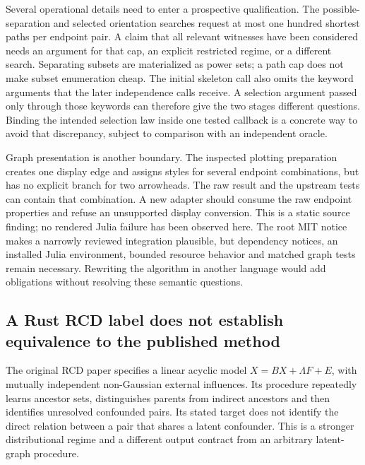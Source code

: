 Several operational details need to enter a prospective qualification.
The possible-separation and selected orientation searches request at
most one hundred shortest paths per endpoint pair. A claim that all
relevant witnesses have been considered needs an argument for that cap,
an explicit restricted regime, or a different search. Separating subsets
are materialized as power sets; a path cap does not make subset
enumeration cheap. The initial skeleton call also omits the keyword
arguments that the later independence calls receive. A selection
argument passed only through those keywords can therefore give the two
stages different questions. Binding the intended selection law inside
one tested callback is a concrete way to avoid that discrepancy, subject
to comparison with an independent oracle.
\citep{exec14_olatent_causalinference}

Graph presentation is another boundary. The inspected plotting
preparation creates one display edge and assigns styles for several
endpoint combinations, but has no explicit branch for two arrowheads.
The raw result and the upstream tests can contain that combination. A
new adapter should consume the raw endpoint properties and refuse an
unsupported display conversion. This is a static source finding; no
rendered Julia failure has been observed here. The root MIT notice makes
a narrowly reviewed integration plausible, but dependency notices, an
installed Julia environment, bounded resource behavior and matched graph
tests remain necessary. Rewriting the algorithm in another language
would add obligations without resolving these semantic questions.
\citep{exec14_olatent_causalinference}

\hypertarget{a-rust-rcd-label-does-not-establish-equivalence-to-the-published-method}{%
\subsection{A Rust RCD label does not establish equivalence to the
published
method}\label{a-rust-rcd-label-does-not-establish-equivalence-to-the-published-method}}

The original RCD paper specifies a linear acyclic model
\(X=BX+\Lambda F+E\), with mutually independent non-Gaussian external
influences. Its procedure repeatedly learns ancestor sets, distinguishes
parents from indirect ancestors and then identifies unresolved
confounded pairs. Its stated target does not identify the direct
relation between a pair that shares a latent confounder. This is a
stronger distributional regime and a different output contract from an
arbitrary latent-graph procedure. \citep{exec14_olatent_rcd_paper}

